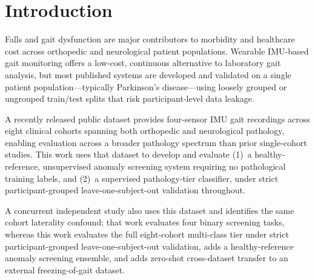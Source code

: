 
\section{Introduction}

Falls and gait dysfunction are major contributors to morbidity and healthcare cost across orthopedic and neurological patient populations. Wearable IMU-based gait monitoring offers a low-cost, continuous alternative to laboratory gait analysis, but most published systems are developed and validated on a single patient population---typically Parkinson's disease---using loosely grouped or ungrouped train/test splits that risk participant-level data leakage.

A recently released public dataset \citep{voisard2025,voisard2025figshare} provides four-sensor IMU gait recordings across eight clinical cohorts spanning both orthopedic and neurological pathology, enabling evaluation across a broader pathology spectrum than prior single-cohort studies. This work uses that dataset to develop and evaluate (1)~a healthy-reference, unsupervised anomaly screening system requiring no pathological training labels, and (2)~a supervised pathology-tier classifier, under strict participant-grouped leave-one-subject-out validation throughout.

A concurrent independent study \citep{sadeghsalehi2025} also uses this dataset and identifies the same cohort laterality confound; that work evaluates four binary screening tasks, whereas this work evaluates the full eight-cohort multi-class tier under strict participant-grouped leave-one-subject-out validation, adds a healthy-reference anomaly screening ensemble, and adds zero-shot cross-dataset transfer to an external freezing-of-gait dataset.

